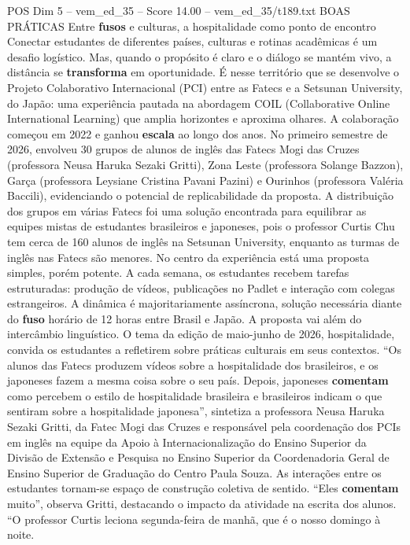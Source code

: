 \begin{textsample}{POS Dim 5 – vem\_ed\_35 – Score 14.00 – vem\_ed\_35/t189.txt}  \label{ex:f5_pos_006}
BOAS PRÁTICAS Entre \textbf{fusos} e culturas, a hospitalidade como ponto de encontro Conectar estudantes de diferentes países, culturas e rotinas acadêmicas é um desafio logístico.
Mas, quando o propósito é claro e o diálogo se mantém vivo, a distância se \textbf{transforma} em oportunidade.
É nesse território que se desenvolve o Projeto Colaborativo Internacional (PCI) entre as Fatecs e a Setsunan University, do Japão: uma experiência pautada na abordagem COIL (Collaborative Online International Learning) que amplia horizontes e aproxima olhares.
A colaboração começou em 2022 e ganhou \textbf{escala} ao longo dos anos.
No primeiro semestre de 2026, envolveu 30 grupos de alunos de inglês das Fatecs Mogi das Cruzes (professora Neusa Haruka Sezaki Gritti), Zona Leste (professora Solange Bazzon), Garça (professora Leysiane Cristina Pavani Pazini) e Ourinhos (professora Valéria Baccili), evidenciando o potencial de replicabilidade da proposta.
A distribuição dos grupos em várias Fatecs foi uma solução encontrada para equilibrar as equipes mistas de estudantes brasileiros e japoneses, pois o professor Curtis Chu tem cerca de 160 alunos de inglês na Setsunan University, enquanto as turmas de inglês nas Fatecs são menores.
No centro da experiência está uma proposta simples, porém potente.
A cada semana, os estudantes recebem tarefas estruturadas: produção de vídeos, publicações no Padlet e interação com colegas estrangeiros.
A dinâmica é majoritariamente assíncrona, solução necessária diante do \textbf{fuso} horário de 12 horas entre Brasil e Japão.
A proposta vai além do intercâmbio linguístico.
O tema da edição de maio-junho de 2026, hospitalidade, convida os estudantes a refletirem sobre práticas culturais em seus contextos. “Os alunos das Fatecs produzem vídeos sobre a hospitalidade dos brasileiros, e os japoneses fazem a mesma coisa sobre o seu país.
Depois, japoneses \textbf{comentam} como percebem o estilo de hospitalidade brasileira e brasileiros indicam o que sentiram sobre a hospitalidade japonesa”, sintetiza a professora Neusa Haruka Sezaki Gritti, da Fatec Mogi das Cruzes e responsável pela coordenação dos PCIs em inglês na equipe da Apoio à Internacionalização do Ensino Superior da Divisão de Extensão e Pesquisa no Ensino Superior da Coordenadoria Geral de Ensino Superior de Graduação do Centro Paula Souza.
As interações entre os estudantes tornam-se espaço de construção coletiva de sentido. “Eles \textbf{comentam} muito”, observa Gritti, destacando o impacto da atividade na escrita dos alunos. “O professor Curtis leciona segunda-feira de manhã, que é o nosso domingo à noite.

\end{textsample}
